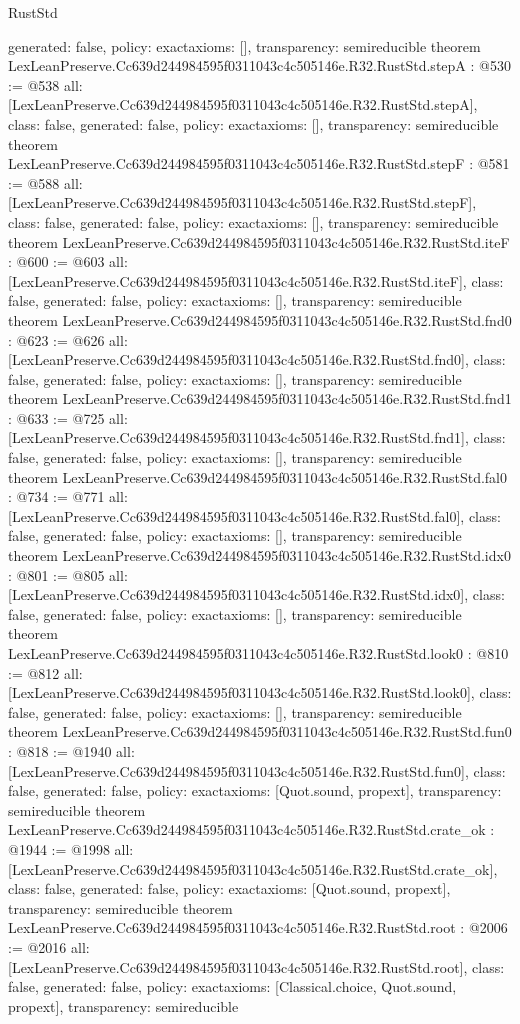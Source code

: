 \begin{lexlean}{RustStd}
\begin{coremodule}
{  generated: false,
  policy: exact{axioms: []},
  transparency: semireducible
}
theorem LexLeanPreserve.Cc639d244984595f0311043c4c505146e.R32.RustStd.stepA : @530 := @538 {
  all: [LexLeanPreserve.Cc639d244984595f0311043c4c505146e.R32.RustStd.stepA],
  class: false,
  generated: false,
  policy: exact{axioms: []},
  transparency: semireducible
}
theorem LexLeanPreserve.Cc639d244984595f0311043c4c505146e.R32.RustStd.stepF : @581 := @588 {
  all: [LexLeanPreserve.Cc639d244984595f0311043c4c505146e.R32.RustStd.stepF],
  class: false,
  generated: false,
  policy: exact{axioms: []},
  transparency: semireducible
}
theorem LexLeanPreserve.Cc639d244984595f0311043c4c505146e.R32.RustStd.iteF : @600 := @603 {
  all: [LexLeanPreserve.Cc639d244984595f0311043c4c505146e.R32.RustStd.iteF],
  class: false,
  generated: false,
  policy: exact{axioms: []},
  transparency: semireducible
}
theorem LexLeanPreserve.Cc639d244984595f0311043c4c505146e.R32.RustStd.fnd0 : @623 := @626 {
  all: [LexLeanPreserve.Cc639d244984595f0311043c4c505146e.R32.RustStd.fnd0],
  class: false,
  generated: false,
  policy: exact{axioms: []},
  transparency: semireducible
}
theorem LexLeanPreserve.Cc639d244984595f0311043c4c505146e.R32.RustStd.fnd1 : @633 := @725 {
  all: [LexLeanPreserve.Cc639d244984595f0311043c4c505146e.R32.RustStd.fnd1],
  class: false,
  generated: false,
  policy: exact{axioms: []},
  transparency: semireducible
}
theorem LexLeanPreserve.Cc639d244984595f0311043c4c505146e.R32.RustStd.fal0 : @734 := @771 {
  all: [LexLeanPreserve.Cc639d244984595f0311043c4c505146e.R32.RustStd.fal0],
  class: false,
  generated: false,
  policy: exact{axioms: []},
  transparency: semireducible
}
theorem LexLeanPreserve.Cc639d244984595f0311043c4c505146e.R32.RustStd.idx0 : @801 := @805 {
  all: [LexLeanPreserve.Cc639d244984595f0311043c4c505146e.R32.RustStd.idx0],
  class: false,
  generated: false,
  policy: exact{axioms: []},
  transparency: semireducible
}
theorem LexLeanPreserve.Cc639d244984595f0311043c4c505146e.R32.RustStd.look0 : @810 := @812 {
  all: [LexLeanPreserve.Cc639d244984595f0311043c4c505146e.R32.RustStd.look0],
  class: false,
  generated: false,
  policy: exact{axioms: []},
  transparency: semireducible
}
theorem LexLeanPreserve.Cc639d244984595f0311043c4c505146e.R32.RustStd.fun0 : @818 := @1940 {
  all: [LexLeanPreserve.Cc639d244984595f0311043c4c505146e.R32.RustStd.fun0],
  class: false,
  generated: false,
  policy: exact{axioms: [Quot.sound, propext]},
  transparency: semireducible
}
theorem LexLeanPreserve.Cc639d244984595f0311043c4c505146e.R32.RustStd.crate_ok : @1944 := @1998 {
  all: [LexLeanPreserve.Cc639d244984595f0311043c4c505146e.R32.RustStd.crate_ok],
  class: false,
  generated: false,
  policy: exact{axioms: [Quot.sound, propext]},
  transparency: semireducible
}
theorem LexLeanPreserve.Cc639d244984595f0311043c4c505146e.R32.RustStd.root : @2006 := @2016 {
  all: [LexLeanPreserve.Cc639d244984595f0311043c4c505146e.R32.RustStd.root],
  class: false,
  generated: false,
  policy: exact{axioms: [Classical.choice, Quot.sound, propext]},
  transparency: semireducible
}


\end{coremodule}
\end{lexlean}
